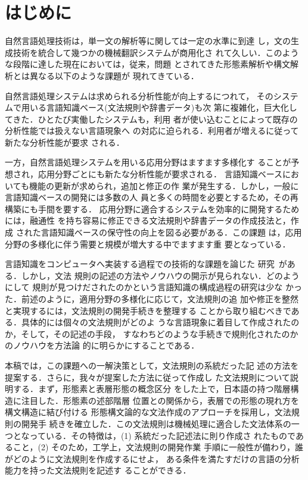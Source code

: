 

\maketitle


\section{はじめに}


自然言語処理技術は，単一文の解析等に関しては一定の水準に到達
し，文の生成技術を統合して幾つかの機械翻訳システムが商用化さ
れて久しい．このような段階に達した現在においては，従来，問題
とされてきた形態素解析や構文解析とは異なる以下のような課題が
現れてきている．


自然言語処理システムは求められる分析性能が向上するにつれて，
そのシステムで用いる言語知識ベース(文法規則や辞書データ)も次
第に複雑化，巨大化してきた．ひとたび実働したシステムも，利用
者が使い込むことによって既存の分析性能では扱えない言語現象へ
の対応に迫られる．利用者が増えるに従って新たな分析性能が要求
される．

一方，自然言語処理システムを用いる応用分野はますます多様化す
ることが予想され，応用分野ごとにも新たな分析性能が要求される．
言語知識ベースにおいても機能の更新が求められ，追加と修正の作
業が発生する．しかし，一般に言語知識ベースの開発には多数の人
員と多くの時間を必要とするため，その再構築にも手間を要する．
応用分野に適合するシステムを効率的に開発するためには，融通性
を持ち容易に修正できる文法規則や辞書データの作成技法と，作成
された言語知識ベースの保守性の向上を図る必要がある．この課題
は，応用分野の多様化に伴う需要と規模が増大する中でますます重
要となっている．


言語知識をコンピュータへ実装する過程での技術的な課題を論じた
研究~\cite{吉村,神岡,奥}がある．しかし，文法
規則の記述の方法やノウハウの開示が見られない．どのようにして
規則が見つけだされたのかという言語知識の構成過程の研究は少な
かった．前述のように，適用分野の多様化に応じて，文法規則の追
加や修正を整然と実現するには，文法規則の開発手続きを整理する
ことから取り組むべきである．具体的には個々の文法規則がどのよ
うな言語現象に着目して作成されたのか，そして，その記述の手段，
すなわちどのような手続きで規則化されたのかのノウハウを方法論
的に明らかにすることである．

本稿では，この課題への一解決策として，文法規則の系統だった記
述の方法を提案する．さらに，我々が提案した方法に従って作成し
た文法規則について説明する．まず，形態素と表層形態の概念区分
をした上で，日本語の持つ階層構造に注目した．形態素の述部階層
位置との関係から，表層での形態の現れ方を構文構造に結び付ける
形態構文論的な文法作成のアプローチを採用し，文法規則の開発手
続きを確立した．この文法規則は機械処理に適合した文法体系の一
つとなっている．その特徴は，(1) 系統だった記述法に則り作成さ
れたものであること，(2) そのため，工学上，文法規則の開発作業
手順に一般性が備わり，誰がどのように文法規則を作成するにせよ，
ある条件を満たすだけの言語の分析能力を持った文法規則を記述す
ることができる．


